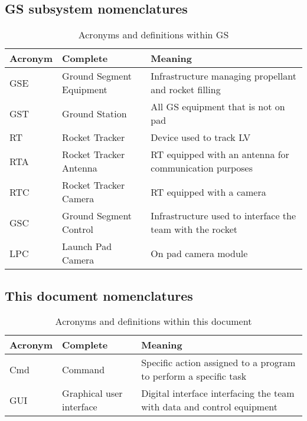\subsection{GS subsystem nomenclatures}
\begin{table}[h]
   \centering
   \caption{Acronyms and definitions within GS}
   \begin{adjustbox}{width=1\textwidth}
   \begin{tabular}{|l|l|l|}
       \hline
       \textbf{Acronym} & \textbf{Complete} & \textbf{Meaning} \\
       \hline
       GSE & Ground Segment Equipment & Infrastructure managing propellant and rocket filling \\
       GST & Ground Station & All GS equipment that is not on pad \\
       RT & Rocket Tracker & Device used to track LV \\
       RTA & Rocket Tracker Antenna & RT equipped with an antenna for communication purposes \\
       RTC & Rocket Tracker Camera & RT equipped with a camera \\
       GSC & Ground Segment Control & Infrastructure used to interface the team with the rocket  \\
       LPC & Launch Pad Camera & On pad camera module \\
       \hline
   \end{tabular}
   \end{adjustbox}
\end{table}

\subsection{This document nomenclatures}
\begin{table}[h]
   \centering
   \caption{Acronyms and definitions within this document}
   \begin{adjustbox}{width=1\textwidth}
   \begin{tabular}{|l|l|l|}
       \hline
       \textbf{Acronym} & \textbf{Complete} & \textbf{Meaning} \\
       \hline
       Cmd & Command & Specific action assigned to a program to perform a specific task \\
       GUI & Graphical user interface & Digital interface interfacing the team with data and control equipment \\
       \hline
   \end{tabular}
   \end{adjustbox}
\end{table}
